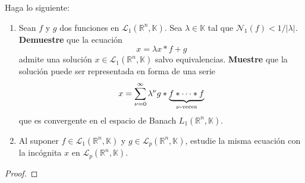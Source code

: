 \documentclass[12pt]{report}
\theoremstyle{largebreak}
\newcommand\abs[1]{\ensuremath{\big|#1\big|}}
\newcommand{\N}[2]{\ensuremath{\mathcal{N}_{#1}\left(#2\right)}}
\begin{document}
    \begin{excer}
        Haga lo siguiente:
        \begin{enumerate}
            \item Sean $f$ y $g$ dos funciones en $\mathcal{L}_1(\mathbb{R}^n,\mathbb{K})$. Sea $\lambda\in\mathbb{K}$ tal que $\N{1}{f}<1/\abs{\lambda}$. \textbf{Demuestre} que la ecuación
            \begin{equation*}
                x=\lambda x*f+g
            \end{equation*}
            admite una solución $x\in\mathcal{L}_1(\mathbb{R}^n,\mathbb{K})$ salvo equivalencias. \textbf{Muestre} que la solución puede ser representada en forma de una serie
            \begin{equation*}
                x=\sum_{\nu=0}^\infty \lambda^\nu g*\underbrace{f*\cdots*f}_{\nu\textup{-veces}}
            \end{equation*}
            que es convergente en el espacio de Banach $L_1(\mathbb{R}^n,\mathbb{K})$.

            \item Al suponer $f\in\mathcal{L}_1(\mathbb{R}^n,\mathbb{K})$ y $g\in\mathcal{L}_p(\mathbb{R}^n,\mathbb{K})$, estudie la misma ecuación con la incógnita $x$ en $\mathcal{L}_p(\mathbb{R}^n,\mathbb{K})$.
        \end{enumerate}
    \end{excer}

    \begin{proof}
        
    \end{proof}
\end{document}
